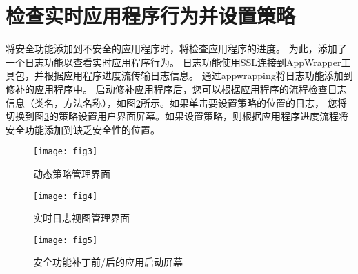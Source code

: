 	\section{检查实时应用程序行为并设置策略}
	
		将安全功能添加到不安全的应用程序时，将检查应用程序的进度。 为此，添加了一个日志功能以查看实时应用程序行为。 日志功能使用SSL连接到AppWrapper工具包，并根据应用程序进度流传输日志信息。 通过appwrapping将日志功能添加到修补的应用程序中。 启动修补应用程序后，您可以根据应用程序的流程检查日志信息（类名，方法名称），如图\ref{fig_4}所示。如果单击要设置策略的位置的日志， 您将切换到图\ref{fig_5}的策略设置用户界面屏幕。如果设置策略，则根据应用程序进度流程将安全功能添加到缺乏安全性的位置。
		
		\begin{figure}[hbt]
			\centering
			\texttt{[image: fig3]}
			\caption{动态策略管理界面}
			\label{fig_3}
		\end{figure}
		
		\begin{figure}[hbt]
			\centering
			\texttt{[image: fig4]}
			\caption{实时日志视图管理界面}
			\label{fig_4}
		\end{figure}
		
		\begin{figure}[hbt]
			\centering
			\texttt{[image: fig5]}
			\caption{安全功能补丁前/后的应用启动屏幕}
			\label{fig_5}
		\end{figure}